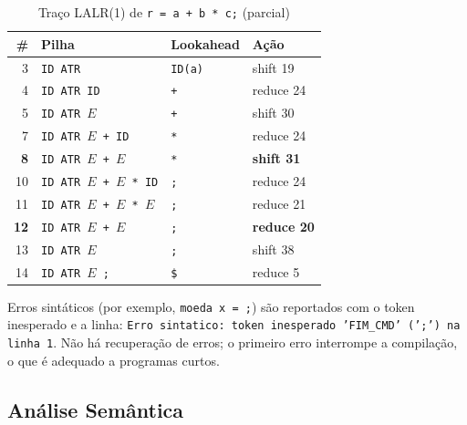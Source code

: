 \documentclass[conference]{IEEEtran}
\begin{document}
\begin{table}[!htbp]
\caption{Traço LALR(1) de \texttt{r = a + b * c;} (parcial)}
\label{tab:traco}
\centering
\footnotesize
\begin{tabular}{@{}rp{}ll@{}}
\toprule
\textbf{\#} & \textbf{Pilha} & \textbf{Lookahead} & \textbf{Ação} \\
\midrule
3 & \texttt{ID ATR} & \texttt{ID(a)} & shift 19 \\
4 & \texttt{ID ATR ID} & \texttt{+} & reduce 24 \\
5 & \texttt{ID ATR $E$} & \texttt{+} & shift 30 \\
7 & \texttt{ID ATR $E$ + ID} & \texttt{*} & reduce 24 \\
\textbf{8} & \texttt{ID ATR $E$ + $E$} & \texttt{*} & \textbf{shift 31} \\
10 & \texttt{ID ATR $E$ + $E$ * ID} & \texttt{;} & reduce 24 \\
11 & \texttt{ID ATR $E$ + $E$ * $E$} & \texttt{;} & reduce 21 \\
\textbf{12} & \texttt{ID ATR $E$ + $E$} & \texttt{;} & \textbf{reduce 20} \\
13 & \texttt{ID ATR $E$} & \texttt{;} & shift 38 \\
14 & \texttt{ID ATR $E$ ;} & \texttt{\$} & reduce 5 \\
\bottomrule
\end{tabular}
\end{table}

Erros sintáticos (por exemplo, \texttt{moeda x = ;}) são reportados com o token inesperado e a linha: \texttt{Erro sintatico: token inesperado 'FIM\_CMD' (';') na linha 1}. Não há recuperação de erros; o primeiro erro interrompe a compilação, o que é adequado a programas curtos.

\subsection{Análise Semântica}
\label{sec:semantica}
\end{document}
